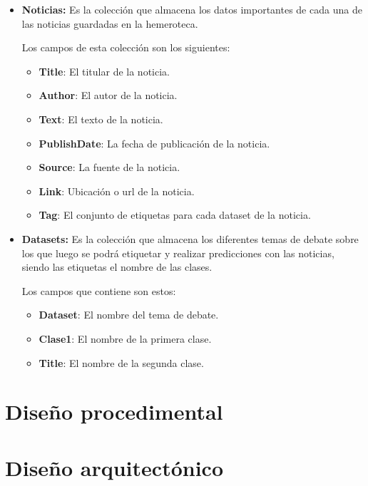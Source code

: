 \begin{itemize}

\item \textbf{Noticias:} Es la colección que almacena los datos importantes de cada una de las noticias guardadas en la hemeroteca.

Los campos de esta colección son los siguientes:

\begin{itemize}

\item \textbf{Title}: El titular de la noticia.
\item \textbf{Author}: El autor de la noticia.
\item \textbf{Text}: El texto de la noticia.
\item \textbf{PublishDate}: La fecha de publicación de la noticia.
\item \textbf{Source}: La fuente de la noticia.
\item \textbf{Link}: Ubicación o url de la noticia.
\item \textbf{Tag}: El conjunto de etiquetas para cada dataset de la noticia.

\end{itemize}

\item \textbf{Datasets:} Es la colección que almacena los diferentes temas de debate sobre los que luego se podrá etiquetar y realizar predicciones con las noticias, siendo las etiquetas el nombre de las clases. 

Los campos que contiene son estos:

\begin{itemize}

\item \textbf{Dataset}: El nombre del tema de debate.
\item \textbf{Clase1}: El nombre de la primera clase.
\item \textbf{Title}: El nombre de la segunda clase.

\end{itemize}

\end{itemize}

\section{Diseño procedimental}

\section{Diseño arquitectónico}


